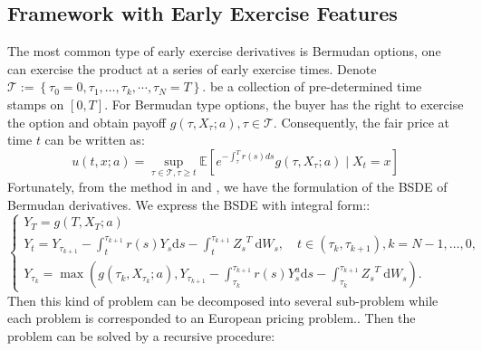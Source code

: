 \documentclass[11pt,a4paper]{article}
\theoremstyle{remark}
\begin{document}
	\subsection{Framework with Early Exercise Features}
	The most common type of early exercise derivatives is Bermudan options, one can exercise the product at a series of early exercise times. Denote $\mathcal{T}:=\left\{\tau_0=0, \tau_1, \ldots, \tau_k,\cdots,\tau_N=T\right\}$. be a collection
	of pre-determined time stamps on $[0, T]$. For Bermudan type options, the buyer has the right to exercise
	the option and obtain payoff $g(\tau, X_{\tau}; a), \tau \in \mathcal{T}$. Consequently, the fair price at time $t$ can be written as:
	\begin{equation*}
		u(t, x; a)=\sup _{\tau \in \mathcal{T}, \tau \geq t} \mathbb{E}\left[e^{-\int_{\tau}^T r(s) ds} g\left(\tau, X_\tau; a\right) \mid X_t = x\right]
	\end{equation*}
	Fortunately, from the method in \cite{gao2022convergence} and \cite{wang2018deep}, we have the formulation of the BSDE of Bermudan derivatives. We express the BSDE with integral form::
	\begin{equation} \label{bsde: amc}
		\left\{\begin{array}{l}
			Y_T=g\left(T, X_T; a\right) \\
			Y_t=Y_{\tau_{k+1}}-\int_t^{\tau_{k+1}} r(s)Y_s \mathrm{d} s-\int_t^{\tau_{k+1}} {Z_s}^{T} \mathrm{~d} W_s, \quad t \in\left(\tau_k, \tau_{k+1}\right), k=N-1, \ldots, 0, \\
			Y_{\tau_k}=\max \left(g\left(\tau_k, X_{\tau_k}; a\right), Y_{\tau_{k+1}}-\int_{\tau_k}^{\tau_{k+1}} r(s)Y^a_s \mathrm{d} s-\int_{\tau_k}^{\tau_{k+1}} {Z_s}^{T} \mathrm{~d} W_s\right) .
		\end{array}\right.
	\end{equation}
	Then this kind of problem can be decomposed into several sub-problem while each problem is corresponded to an European pricing problem.. Then the problem can be solved by a recursive procedure:
\end{document}
